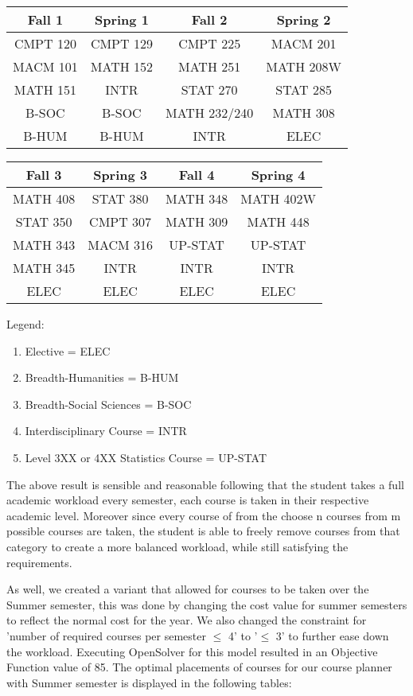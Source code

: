 \documentclass{article}
\begin{document}
\begin{center}
 \begin{tabular}{|c c c c|} 
 \hline
 Fall 1 & Spring 1 & Fall 2 & Spring 2 \\ [0.5ex] 
 \hline\hline
 CMPT 120 & CMPT 129 & CMPT 225 & MACM 201  \\ 
 \hline
 MACM 101 & MATH 152 & MATH 251 & MATH 208W \\
 \hline
 MATH 151 & INTR & STAT 270 & STAT 285 \\
 \hline
 B-SOC & B-SOC & MATH 232/240 & MATH 308\\
 \hline
 B-HUM & B-HUM & INTR & ELEC\\ [1ex] 
 \hline
\end{tabular}

 \begin{tabular}{|c c c c|} 
 \hline
 Fall 3 & Spring 3 & Fall 4 & Spring 4 \\ [0.5ex] 
 \hline\hline
  MATH 408 & STAT 380 & MATH 348 & MATH 402W \\ 
 \hline
  STAT 350 & CMPT 307 & MATH 309 & MATH 448 \\
 \hline
  MATH 343 & MACM 316 & UP-STAT & UP-STAT \\
 \hline
 MATH 345 & INTR & INTR & INTR\\
 \hline
 ELEC & ELEC & ELEC & ELEC \\ [1ex] 
 \hline
\end{tabular}
\end{center}
Legend:
\begin{enumerate}
    \item Elective = ELEC
    \item Breadth-Humanities = B-HUM
    \item Breadth-Social Sciences = B-SOC
    \item Interdisciplinary Course = INTR
    \item Level 3XX or 4XX Statistics Course = UP-STAT
\end{enumerate}

\noindent
The above result is sensible and reasonable following that the student takes a full academic workload every semester, each course is taken in their respective academic level. Moreover since every course of from the choose n courses from m possible courses are taken, the student is able to freely remove courses from that category to create a more balanced workload, while still satisfying the requirements.

\medskip
\noindent
As well, we created a variant that allowed for courses to be taken over the Summer semester, this was done by changing the cost value for summer semesters to reflect the normal cost for the year. We also changed the constraint for 'number of required courses per semester $\leq$ 4' to '$\leq$ 3' to further ease down the workload. Executing OpenSolver for this model resulted in an Objective Function value of 85. The optimal placements of courses for our course planner with Summer semester is displayed in the following tables:
\end{document}
